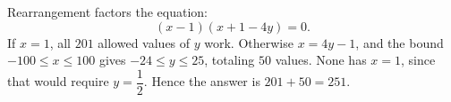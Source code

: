 Rearrangement factors the equation:
\[
(x-1)(x+1-4y)=0.
\]
If $x=1$, all $201$ allowed values of $y$ work. Otherwise $x=4y-1$, and the bound $-100\le x\le100$ gives $-24\le y\le25$, totaling $50$ values. None has $x=1$, since that would require $y=\dfrac{1}{2}$. Hence the answer is $\boxed{201+50=251}$.
